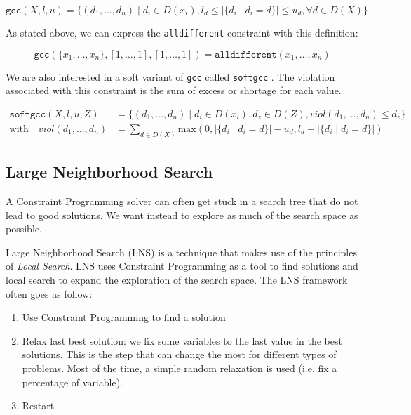 \documentclass[../../thesis.tex]{subfiles}
\begin{document}
\begin{equation*}
  \texttt{gcc}(X, l, u) = \{ (d_1, \dots, d_n) \mid d_i \in D(x_i), l_d \leq |\{ d_i \mid d_i = d \}| \leq u_d, \forall d \in D(X) \}
\end{equation*}

As stated above, we can express the \texttt{alldifferent} constraint with this definition:

\begin{equation*}
\texttt{gcc}(\{ x_1, \dots, x_n \}, [1, \dots, 1], [1, \dots, 1]) = \texttt{alldifferent}(x_1, \dots, x_n)
\end{equation*}


We are also interested in a soft variant of \texttt{gcc} called \texttt{softgcc} \cite{VanHoeve2006}. 
The violation associated with this constraint is the sum of excess or shortage \cite{schaus:softgcc} for each value.

\begin{align*}
  \texttt{softgcc}(X, l, u, Z) &= \{ (d_1, \dots, d_n) \mid d_i \in D(x_i), d_z \in D(Z), viol(d_1, \dots, d_n) \leq d_z \} \\
  \text{with} \quad viol(d_1, \dots, d_n) &= \sum_{d \in D(X)} \text{max}(0, |\{ d_i \mid d_i = d \}| - u_d, l_d - |\{ d_i \mid d_i = d \}|)
\end{align*}


\subsection{Large Neighborhood Search}

A Constraint Programming solver can often get stuck in a search tree that do not lead to good solutions.
We want instead to explore as much of the search space as possible. 

Large Neighborhood Search (LNS) is a technique that makes use of the principles of \emph{Local Search}.
LNS uses Constraint Programming as a tool to find solutions and local search to expand the exploration of the search space. 
The LNS framework often goes as follow:

\begin{enumerate}
  \item Use Constraint Programming to find a solution 
  \item Relax last best solution: we fix some variables to the last value in the best solutions. This is the 
        step that can change the most for different types of problems. Most of the time, a simple random relaxation is used (i.e. fix a percentage of variable).
  \item Restart
\end{enumerate}
\end{document}
